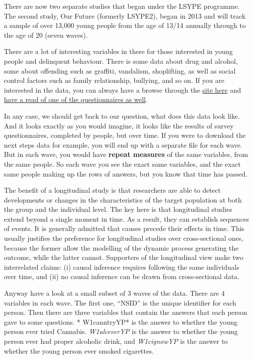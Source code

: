\documentclass[]{book}
\theoremstyle{definition}
\theoremstyle{definition}
\theoremstyle{definition}
\theoremstyle{remark}
\begin{document}
There are now two separate studies that began under the LSYPE programme.
The second study, Our Future (formerly LSYPE2), began in 2013 and will
track a sample of over 13,000 young people from the age of 13/14
annually through to the age of 20 (seven waves).

There are a lot of interesting variables in there for those interested
in young people and delinquent behaviour. There is some data about drug
and alcohol, some about offending such as graffiti, vandalism,
shoplifting, as well as social control factors such as family
relationship, bullying, and so on. If you are interested in the data,
you can always have a browse through the
\href{https://discover.ukdataservice.ac.uk/Catalogue/?sn=5545\&type=Data\%20catalogue\&lt}{site
here} and
\href{http://doc.ukdataservice.ac.uk/doc/5545/mrdoc/pdf/5545age_25_survey_questionnaire.pdf}{have
a read of one of the questionnaires as well}.

In any case, we should get back to our question, what does this data
look like. And it looks exactly as you would imagine, it looks like the
results of survey questionnaires, completed by people, but over time. If
you were to download the next steps data for example, you will end up
with a separate file for each wave. But in each wave, you would have
\textbf{repeat measures} of the same variables, from the same people. So
each wave you see the exact same variables, and the exact same people
making up the rows of answers, but you know that time has passed.

The benefit of a longitudinal study is that researchers are able to
detect developments or changes in the characteristics of the target
population at both the group and the individual level. The key here is
that longitudinal studies extend beyond a single moment in time. As a
result, they can establish sequences of events. It is generally admitted
that causes precede their effects in time. This usually justifies the
preference for longitudinal studies over cross-sectional ones, because
the former allow the modelling of the dynamic process generating the
outcome, while the latter cannot. Supporters of the longitudinal view
make two interrelated claims: (i) causal inference requires following
the same individuals over time, and (ii) no causal inference can be
drawn from cross-sectional data.

Anyway have a look at a small subset of 3 waves of the data. There are 4
variables in each wave. The first one, ``NSID'' is the unique identifier
for each person. Then there are three variables that contain the answers
that each person gave to some questions. * W1canntryYP* is the answer to
whether the young person ever tried Cannabis. \emph{W1alceverYP} is the
answer to whether the young person ever had proper alcoholic drink, and
\emph{W1cignowYP} is the answer to whether the young person ever smoked
cigarettes.
\end{document}
